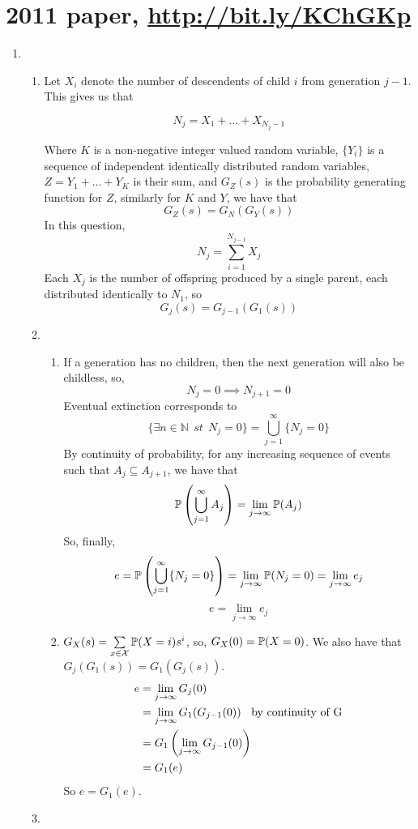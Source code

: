 \documentclass{article}
\begin{document}
\section*{2011 paper, \url{http://bit.ly/KChGKp}}
\begin{enumerate}
\item
\begin{enumerate}
\item
Let $X_i$ denote the number of descendents of child $i$ from generation $j-1$. This gives us that

$$
N_j = X_1 + \dots + X_{N_j-1}
$$

Where $K$ is a non-negative integer valued random variable, $\{Y_i\}$ is a sequence of independent identically distributed random variables, $Z=Y_1+\dots+Y_K$ is their sum, and $G_Z(s)$ is the probability generating function for $Z$, similarly for $K$ and $Y$, we have that
$$
G_Z(s) = G_N(G_Y(s))
$$
In this question, 
$$
N_j=\sum^{N_{j-1}}_{i=1}X_j
$$
Each $X_j$ is the number of offspring produced by a single parent, each distributed identically to $N_1$, so
$$
G_j(s) = G_{j-1}(G_1(s))
$$
\item
\begin{enumerate}
\item 
If a generation has no children, then the next generation will also be childless, so,
$$
N_j=0 \implies N_{j+1}=0
$$
Eventual extinction corresponds to 
$$
\{\exists n \in \mathbb{N} \;\, st \;\, N_j=0\} = \bigcup^\infty_{j=1}\{N_j=0\}
$$
By continuity of probability, for any increasing sequence of events such that $A_j \subseteq A_{j+1}$, we have that
$$
\mathbb{P}\left(\bigcup^\infty_{j=1}A_j\right) = \lim_{j\rightarrow\infty} \mathbb{P}(A_j)
$$
So, finally,
$$
e=\mathbb{P}\left(\bigcup^\infty_{j=1}\{N_j=0\}\right) = \lim_{j\rightarrow\infty} \mathbb{P}(N_j=0) = \lim_{j\rightarrow\infty}e_j
$$
$$
e=\lim_{j\rightarrow\infty}e_j
$$
\item
$G_X(s) = \sum\limits_{x \in \mathcal{X}}\mathbb{P}(X=i)s^i$, so, $G_X(0) = \mathbb{P}(X=0)$. We also have that $G_j(G_1(s)) = G_1(G_j(s))$.
\begin{align*}
e &= \lim_{j\rightarrow\infty}G_j(0)\\
&= \lim_{j\rightarrow\infty}G_1(G_{j-1}(0))\mbox{\;\; by continuity of G}\\
&= G_1\left(\lim_{j\rightarrow\infty}G_{j-1}(0)\right)\\
&= G_1(e)
\end{align*}
So $e = G_1(e)$.
\end{enumerate}
\item
\begin{enumerate}

\end{enumerate}
\end{enumerate}
\end{enumerate}
\end{document}
